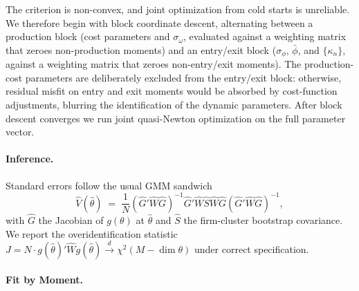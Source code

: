 \documentclass[12pt]{article}
\begin{document}
The criterion is non-convex, and joint optimization from cold starts is unreliable. We therefore begin with block coordinate descent, alternating between a production block (cost parameters and $\sigma_\omega$, evaluated against a weighting matrix that zeroes non-production moments) and an entry/exit block ($\sigma_\phi$, $\bar\phi$, and $\{\kappa_n\}$, against a weighting matrix that zeroes non-entry/exit moments). The production-cost parameters are deliberately excluded from the entry/exit block: otherwise, residual misfit on entry and exit moments would be absorbed by cost-function adjustments, blurring the identification of the dynamic parameters. After block descent converges we run joint quasi-Newton optimization on the full parameter vector.
 
\paragraph{Inference.} Standard errors follow the usual GMM sandwich
\begin{equation*}
\hat V(\hat\theta) \;=\; \frac{1}{N}(\hat G'\hat W\hat G)^{-1}\hat G'\hat W\hat S\hat W\hat G(\hat G'\hat W\hat G)^{-1},
\end{equation*}
with $\hat G$ the Jacobian of $g(\theta)$ at $\hat\theta$ and $\hat S$ the firm-cluster bootstrap covariance. We report the overidentification statistic $J = N\cdot g(\hat\theta)'\hat W g(\hat\theta) \overset{d}{\to} \chi^2(M-\dim\theta)$ under correct specification.

\paragraph{Fit by Moment.}
\end{document}
